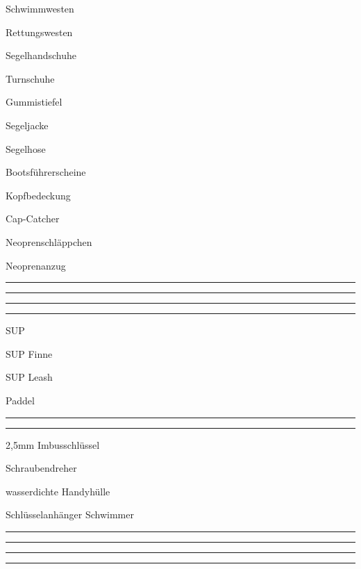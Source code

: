 \begin{VIERitemize}
    \item{Schwimmwesten}
    \item{Rettungswesten}
    \item{Segelhandschuhe}
    \item{Turnschuhe}
    \item{Gummistiefel}
    \item{Segeljacke}
    \item{Segelhose}
    \item{Bootsführerscheine}
    \item{Kopfbedeckung}
    \item{Cap-Catcher}
    \item{Neoprenschläppchen}
    \item{Neoprenanzug}
    \item{\rule{50mm}{0.4pt}}
    \item{\rule{50mm}{0.4pt}}
    \item{\rule{50mm}{0.4pt}}
    \item{\rule{50mm}{0.4pt}}
\end{VIERitemize}

\begin{TWOitemize}
    \item{SUP}
    \item{SUP Finne}
    \item{SUP Leash}
    \item{Paddel}
    \item{\rule{50mm}{0.4pt}}
    \item{\rule{50mm}{0.4pt}}
\end{TWOitemize}

\begin{ONEitemize}
    \item{2,5mm Imbusschlüssel}
    \item{Schraubendreher}
    \item{wasserdichte Handyhülle}
    \item{Schlüsselanhänger Schwimmer}
    \item{\rule{50mm}{0.4pt}}
    \item{\rule{50mm}{0.4pt}}
    \item{\rule{50mm}{0.4pt}}
    \item{\rule{50mm}{0.4pt}}
\end{ONEitemize}
